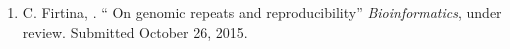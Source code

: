 
\begin{enumerate}
\item 
C. Firtina, \calkan{}. `` On genomic repeats and reproducibility''
{\em Bioinformatics}, under review. Submitted October 26, 2015.
\end{enumerate}
